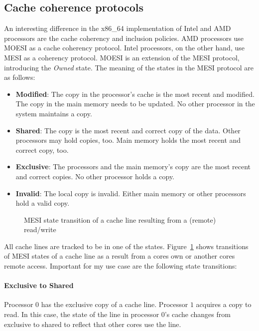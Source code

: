 \subsection{Cache coherence protocols}
\label{sec:state:technical:caches_protocol}
An interesting difference in the x86\_64 implementation of Intel and AMD
processors are the cache coherency and inclusion policies. AMD processors use
MOESI as a cache coherency protocol.\cite{amd_manual} Intel processors, on the
other hand, use MESI as a coherency protocol.\cite{intel_sdm} MOESI is an
extension of the MESI protocol, introducing the \textit{Owned} state. The
meaning of the states in the MESI protocol are as follows:
\begin{itemize}
    \item \textbf{Modified}: The copy in the processor's cache is the most
          recent and modified. The copy in the main memory needs to be updated.
          No other processor in the system maintains a copy.
    \item \textbf{Shared}:  The copy is the most recent and correct copy of the
          data. Other processors may hold copies, too. Main memory holds the
          most recent and correct copy, too.
    \item \textbf{Exclusive}: The processors and the main memory's copy are the
          most recent and correct copies. No other processor holds a copy.
    \item \textbf{Invalid}: The local copy is invalid. Either main memory or
          other processors hold a valid copy.
\end{itemize}

\begin{figure}
    \begin{center}
        
        \caption{MESI state transition of a cache line resulting from a (remote) read/write}
        \label{fig:state:technical:mesi}
    \end{center}
\end{figure}

All cache lines are tracked to be in one of the states.
Figure~\ref{fig:state:technical:mesi} shows transitions of MESI states of a
cache line as a result from a cores own or another cores remote access.
Important for my use case are the following state transitions:

\paragraph{Exclusive to Shared}
Processor $0$ has the exclusive copy of a cache line. Processor $1$ acquires a
copy to read. In this case, the state of the line in processor $0$'s
cache changes from exclusive to shared to reflect that other cores use the line.

